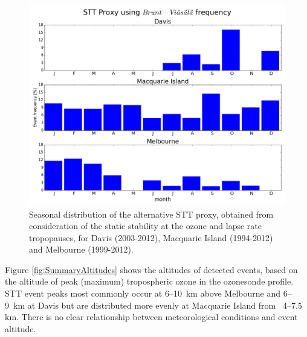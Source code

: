 \documentclass{article}
\begin{document}
  \begin{figure}[!htbp]
    \begin{center}
    \includegraphics[width=0.8\columnwidth]{figures/AndrewProxySTT.png}
    \caption{Seasonal distribution of the alternative STT proxy, obtained from consideration of the static stability at the ozone and lapse rate tropopauses, for Davis (2003-2012), Macquarie Island (1994-2012) and Melbourne (1999-2012).}
    \label{fig:AndrewProxySTT}
    \end{center}
  \end{figure}
  
  Figure \ref{fig:SummaryAltitudes} shows the altitudes of detected events, based on the altitude of peak (maximum) tropospheric ozone in the ozonesonde profile.
  STT event peaks most commonly occur at 6--10~km above Melbourne and 6--9~km at Davis but are distributed more evenly at Macquarie Island from ~4--7.5 km.
  There is no clear relationship between meteorological conditions and event altitude.
  
\end{document}
